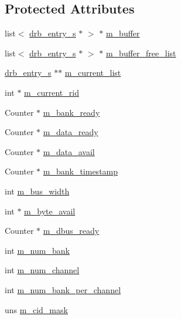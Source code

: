 \subsection*{Protected Attributes}
\begin{DoxyCompactItemize}
\item 
list$<$ \hyperlink{structdrb__entry__s}{drb\_\-entry\_\-s} $\ast$ $>$ $\ast$ \hyperlink{classdram__controller__c_ae827da2c640a345b548f55c4619df6c3}{m\_\-buffer}
\item 
list$<$ \hyperlink{structdrb__entry__s}{drb\_\-entry\_\-s} $\ast$ $>$ $\ast$ \hyperlink{classdram__controller__c_a62d96cc25786a499d89ae5d17732e532}{m\_\-buffer\_\-free\_\-list}
\item 
\hyperlink{structdrb__entry__s}{drb\_\-entry\_\-s} $\ast$$\ast$ \hyperlink{classdram__controller__c_a52b6d16df53c6b0482cbdc782719d3dc}{m\_\-current\_\-list}
\item 
int $\ast$ \hyperlink{classdram__controller__c_a7b69bd4b34ed9754a30e69e0bdebb609}{m\_\-current\_\-rid}
\item 
Counter $\ast$ \hyperlink{classdram__controller__c_ad4f31c52a4c3858ae5fae007bc954c09}{m\_\-bank\_\-ready}
\item 
Counter $\ast$ \hyperlink{classdram__controller__c_a923a18758cbecc2b240c619309f82cdd}{m\_\-data\_\-ready}
\item 
Counter $\ast$ \hyperlink{classdram__controller__c_a9ff45b23f89fb48e07a21253a28d5903}{m\_\-data\_\-avail}
\item 
Counter $\ast$ \hyperlink{classdram__controller__c_ab0c72ef77bc137b1ed16a060dd622c84}{m\_\-bank\_\-timestamp}
\item 
int \hyperlink{classdram__controller__c_a88d2351690ac79425da4af48c28a55bd}{m\_\-bus\_\-width}
\item 
int $\ast$ \hyperlink{classdram__controller__c_add7d44dbb73dedd43c51a97ee1d0c17d}{m\_\-byte\_\-avail}
\item 
Counter $\ast$ \hyperlink{classdram__controller__c_aeff0032fc196b65007b89d00499c2bd1}{m\_\-dbus\_\-ready}
\item 
int \hyperlink{classdram__controller__c_a98fd7fb6cf778ca6bba63a861b551bda}{m\_\-num\_\-bank}
\item 
int \hyperlink{classdram__controller__c_a9a20ac3f7fa0c171702fc265f0ccc9bc}{m\_\-num\_\-channel}
\item 
int \hyperlink{classdram__controller__c_ac3907c9a15aa3131c9aee34313a28e37}{m\_\-num\_\-bank\_\-per\_\-channel}
\item 
uns \hyperlink{classdram__controller__c_ae55d96ec26968a1343ac0de05bd6485d}{m\_\-cid\_\-mask}
$$
\end{DoxyCompactItemize}
